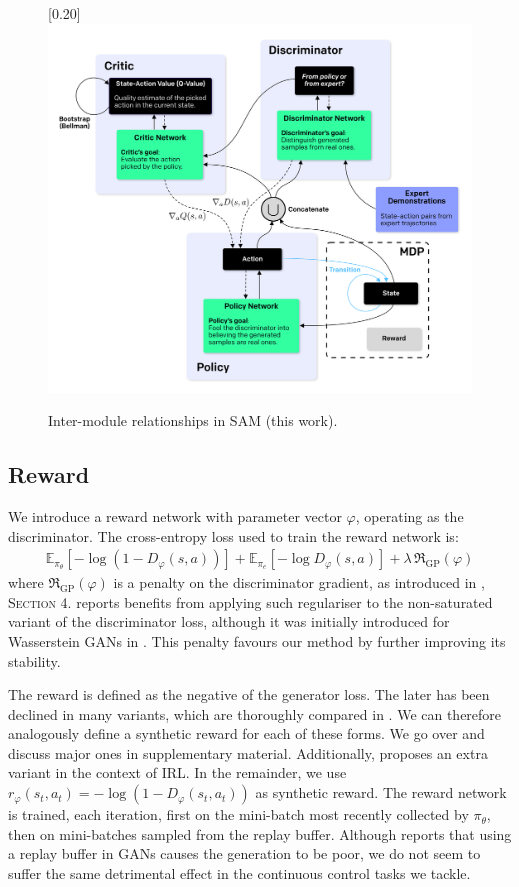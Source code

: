 \begin{figure}[h!]
\center
\scalebox{0.20}[0.20]{\includegraphics{Diags/sam_big}}
\caption{Inter-module relationships in SAM (this work).}
\label{fig:sam_big}
\end{figure}

\subsection{Reward}
We introduce a reward network with parameter vector $\varphi$,
operating as the discriminator.
The cross-entropy loss used to train the reward network is:
\begin{align}
  \mathbb{E}_{\pi_\theta}[- \log (1 - D_\varphi(s, a))]
  + \mathbb{E}_{\pi_e}[- \log D_\varphi(s, a)]
  + \lambda \, \mathfrak{R}_{\text{GP}}(\varphi)
  \label{eq:varphiloss}
\end{align}
where $\mathfrak{R}_{\text{GP}}(\varphi)$ is a
penalty on the discriminator gradient,
as introduced in \cite{Gulrajani2017-mr}, \textsc{Section} 4.
\cite{Lucic2017-nz} reports benefits from applying such regulariser to
the non-saturated variant of the discriminator loss, although it
was initially introduced for Wasserstein GANs \cite{Arjovsky2017-la} in
\cite{Gulrajani2017-mr}.
This penalty favours our method by further improving its stability.

The reward is defined as the negative of the generator loss.
The later has been declined in many variants, which are
thoroughly compared in \cite{Lucic2017-nz}.
We can therefore analogously define a synthetic reward for each of these
forms. We go over and discuss major ones in supplementary material.
Additionally, \cite{Fu2018-zu} proposes an extra variant
in the context of IRL.
In the remainder, we use
$r_\varphi(s_t, a_t) = - \log (1 - D_\varphi(s_t, a_t))$
as synthetic reward.
The reward network is trained, each iteration,
first on the mini-batch most recently collected by $\pi_\theta$,
then on mini-batches sampled from the replay buffer.
Although \cite{Pfau2016-ft} reports that using a replay buffer in GANs
causes the generation to be poor,
we do not seem to suffer the same detrimental effect in
the continuous control tasks we tackle.

